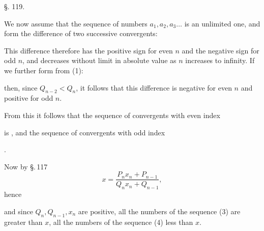 
\begin{center}
§. 119.

\end{center}

We now assume that the sequence of numbers $a_1, a_2, a_3 \ldots$
is an unlimited one, and form the difference of two successive
convergents:

This difference therefore has the positive sign for even $n$ and
the negative sign for odd $n$, and decreases without limit in
absolute value as $n$ increases to infinity. If we further form
from (1):

then, since $Q_{n-2} < Q_n$, it follows that this difference is
negative for even $n$ and positive for odd $n$.

From this it follows that the sequence of convergents with even
index

is , and the sequence of convergents with odd
index

.

Now by \S.\,117
\[
x = \frac{P_n x_n + P_{n-1}}{Q_n x_n + Q_{n-1}},
\]
hence

and since $Q_n, Q_{n-1}, x_n$ are positive, all the numbers of the
sequence (3) are greater than $x$, all the numbers of the sequence
(4) less than $x$.
